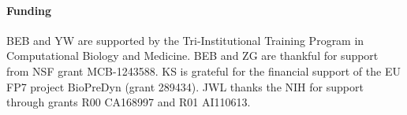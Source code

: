 \documentclass{bioinfo}
\begin{document}
\paragraph{Funding\textcolon}
BEB and YW are supported by the Tri-Institutional Training Program in Computational Biology and Medicine.
BEB and ZG are thankful for support from NSF grant MCB-1243588.
KS is grateful for the financial support of the EU FP7 project BioPreDyn (grant 289434).
JWL thanks the NIH for support through grants R00 CA168997 and R01 AI110613.


%
%
%
%
%
%
%
%
%



\end{document}
